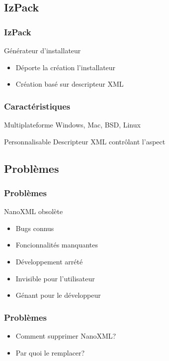 \subsection{IzPack}
\begin{frame}\frametitle{IzPack}
\begin{block}{Générateur d'installateur}
	\begin{itemize}
		\item Déporte la création l'installateur
		\item Création basé sur descripteur XML
	\end{itemize}
\end{block}
\end{frame}
\begin{frame}\frametitle{Caractéristiques}
	\begin{block}{Multiplateforme}
	Windows, Mac, BSD, Linux
	\end{block}
	\begin{block}{Personnalisable}
	Descripteur XML contrôlant l'aspect
	\end{block}
\end{frame}

\subsection{Problèmes}
\begin{frame}\frametitle{Problèmes}
	\begin{block}{NanoXML obsolète}
		\begin{itemize}
		\item Bugs connus
		\item Foncionnalités manquantes
		\item Développement arrété
		\end{itemize}
	\end{block}
	\begin{itemize}
		\item Invisible pour l'utilisateur
		\item Génant pour le développeur	
	\end{itemize}
\end{frame}
\begin{frame}\frametitle{Problèmes}
\begin{itemize}
	\item Comment supprimer NanoXML?
	\item Par quoi le remplacer?	
\end{itemize}
\end{frame}
